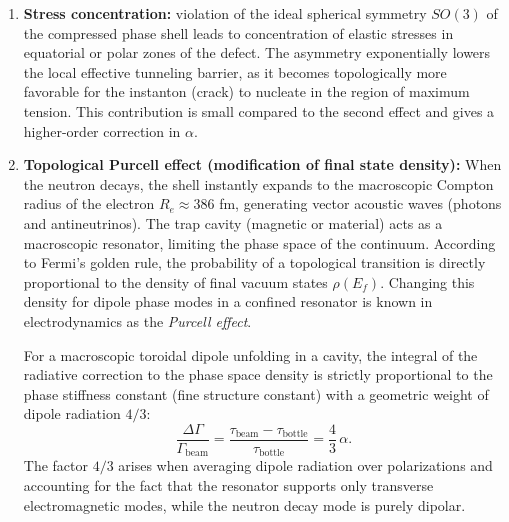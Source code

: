 \documentclass[11pt,a4paper]{article}
\begin{document}
\begin{enumerate}
\item \textbf{Stress concentration:} violation of the ideal spherical symmetry $SO(3)$ of the compressed phase shell leads to concentration of elastic stresses in equatorial or polar zones of the defect. The asymmetry exponentially lowers the local effective tunneling barrier, as it becomes topologically more favorable for the instanton (crack) to nucleate in the region of maximum tension. This contribution is small compared to the second effect and gives a higher-order correction in $\alpha$.

\item \textbf{Topological Purcell effect (modification of final state density):} When the neutron decays, the shell instantly expands to the macroscopic Compton radius of the electron $R_e \approx 386$ fm, generating vector acoustic waves (photons and antineutrinos). The trap cavity (magnetic or material) acts as a macroscopic resonator, limiting the phase space of the continuum. According to Fermi's golden rule, the probability of a topological transition is directly proportional to the density of final vacuum states $\rho(E_f)$. Changing this density for dipole phase modes in a confined resonator is known in electrodynamics as the \textit{Purcell effect}.

For a macroscopic toroidal dipole unfolding in a cavity, the integral of the radiative correction to the phase space density is strictly proportional to the phase stiffness constant (fine structure constant) with a geometric weight of dipole radiation $4/3$:
\begin{equation}
\frac{\Delta \Gamma}{\Gamma_{\text{beam}}} = \frac{\tau_{\text{beam}} - \tau_{\text{bottle}}}{\tau_{\text{bottle}}} = \frac{4}{3}\,\alpha.
\end{equation}
The factor $4/3$ arises when averaging dipole radiation over polarizations and accounting for the fact that the resonator supports only transverse electromagnetic modes, while the neutron decay mode is purely dipolar.
\end{enumerate}
\end{document}
